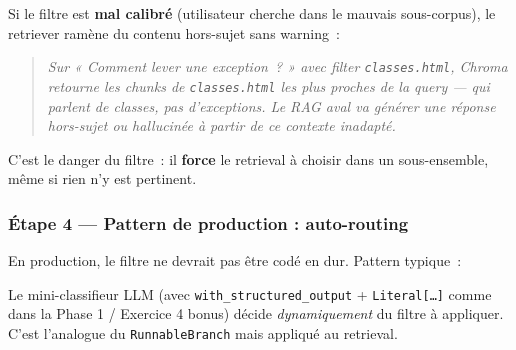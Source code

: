 \documentclass[11pt,a4paper]{article}
\begin{document}
Si le filtre est \textbf{mal calibré} (utilisateur cherche dans le
mauvais sous-corpus), le retriever ramène du contenu hors-sujet sans
warning~:

\begin{quote}\itshape
Sur \emph{« Comment lever une exception~? »} avec filter
\texttt{classes.html}, Chroma retourne les chunks de \texttt{classes.html}
les plus proches de la query — qui parlent de classes, pas d'exceptions.
Le RAG aval va générer une réponse hors-sujet ou hallucinée à partir
de ce contexte inadapté.
\end{quote}

C'est le danger du filtre~: il \textbf{force} le retrieval à choisir
dans un sous-ensemble, même si rien n'y est pertinent.

\subsubsection*{Étape 4 — Pattern de production : auto-routing}

En production, le filtre ne devrait pas être codé en dur. Pattern
typique~:

\begin{center}
\end{center}

Le mini-classifieur LLM (avec \texttt{with\_structured\_output} +
\texttt{Literal[\dots]} comme dans la Phase 1 / Exercice 4 bonus) décide
\emph{dynamiquement} du filtre à appliquer. C'est l'analogue du
\texttt{RunnableBranch} mais appliqué au retrieval.
\end{document}
